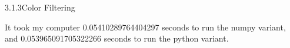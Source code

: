  

%
%

\newcommand{\hmwkTitle}{Lab 05}
\newcommand{\hmwkDueDate}{\today}
\newcommand{\hmwkDueTime}{11:59 PM}
\newcommand{\hmwkClass}{ENAE 380}
\newcommand{\hmwkClassTime}{0106}
\newcommand{\hmwkClassInstructor}{Dr. Mumu Xu}
\newcommand{\hmwkAuthorName}{\textbf{Vai Srivastava}}
\newcommand{\hmwkCompletionDate}{\today}



\maketitle

\pagebreak

\begin{hwkProblem}{3.1.3}{Color Filtering}

	It took my computer 0.05410289764404297 seconds to run the numpy variant, and 0.053965091705322266 seconds to run the python variant.

\end{hwkProblem}

